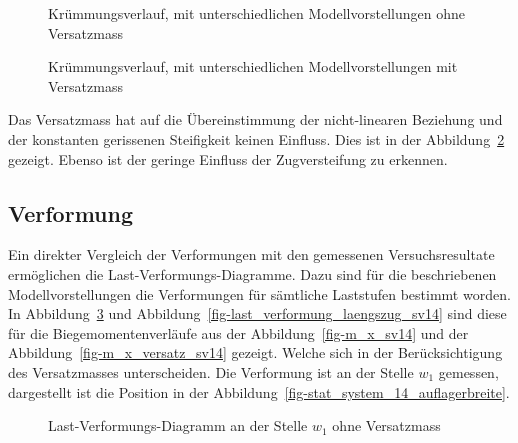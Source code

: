 \documentclass[
  12pt,
  letterpaper,
  egregdoesnotlikesansseriftitles]{scrreprt}
\begin{document}
\begin{figure}[H]


\caption{\label{fig-chi_x_diagramm_vergleich_sv14}Krümmungsverlauf, mit
unterschiedlichen Modellvorstellungen ohne Versatzmass}

\end{figure}%

\begin{figure}[H]


\caption{\label{fig-chi_x_diagramm_laengszugkraft_sv14}Krümmungsverlauf,
mit unterschiedlichen Modellvorstellungen mit Versatzmass}

\end{figure}%

Das Versatzmass hat auf die Übereinstimmung der nicht-linearen Beziehung
und der konstanten gerissenen Steifigkeit keinen Einfluss. Dies ist in
der Abbildung~\ref{fig-chi_x_diagramm_laengszugkraft_sv14} gezeigt.
Ebenso ist der geringe Einfluss der Zugversteifung zu erkennen.

\subsection{Verformung}\label{verformung-1}

Ein direkter Vergleich der Verformungen mit den gemessenen
Versuchsresultate ermöglichen die Last-Verformungs-Diagramme. Dazu sind
für die beschriebenen Modellvorstellungen die Verformungen für sämtliche
Laststufen bestimmt worden. In
Abbildung~\ref{fig-last_verformung_vergleich_sv14} und
Abbildung~\ref{fig-last_verformung_laengszug_sv14} sind diese für die
Biegemomentenverläufe aus der Abbildung~\ref{fig-m_x_sv14} und der
Abbildung~\ref{fig-m_x_versatz_sv14} gezeigt. Welche sich in der
Berücksichtigung des Versatzmasses unterscheiden. Die Verformung ist an
der Stelle \(w_1\) gemessen, dargestellt ist die Position in der
Abbildung~\ref{fig-stat_system_14_auflagerbreite}.

\begin{figure}[H]


\caption{\label{fig-last_verformung_vergleich_sv14}Last-Verformungs-Diagramm
an der Stelle \(w_1\) ohne Versatzmass}

\end{figure}%
\end{document}
